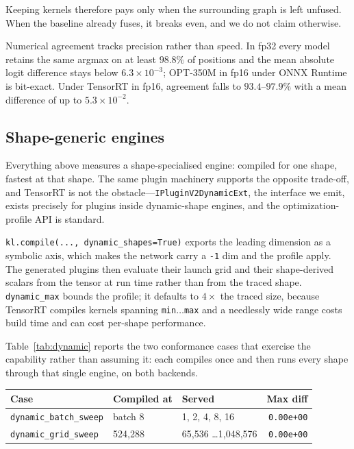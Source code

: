\documentclass[11pt,a4paper]{article}
\begin{document}
Keeping kernels therefore pays only when the surrounding graph is left unfused.
When the baseline already fuses, it breaks even, and we do not claim otherwise.

Numerical agreement tracks precision rather than speed. In fp32 every model
retains the same argmax on at least $98.8\%$ of positions and the mean absolute
logit difference stays below $6.3\times10^{-3}$; OPT-350M in fp16 under ONNX
Runtime is bit-exact. Under TensorRT in fp16, agreement falls to
$93.4$--$97.9\%$ with a mean difference of up to $5.3\times10^{-2}$.

\subsection{Shape-generic engines}
\label{sec:dynamic}

Everything above measures a shape-specialised engine: compiled for one shape,
fastest at that shape. The same plugin machinery supports the opposite
trade-off, and TensorRT is not the obstacle---\texttt{IPluginV2DynamicExt}, the
interface we emit, exists precisely for plugins inside dynamic-shape engines, and
the optimization-profile API is standard.

\texttt{kl.compile(..., dynamic\_shapes=True)} exports the leading dimension as a
symbolic axis, which makes the network carry a \texttt{-1} dim and the profile
apply. The generated plugins then evaluate their launch grid and their
shape-derived scalars from the tensor at run time rather than from the traced
shape. \texttt{dynamic\_max} bounds the profile; it defaults to $4\times$ the
traced size, because TensorRT compiles kernels spanning \texttt{min}$\ldots$\texttt{max}
and a needlessly wide range costs build time and can cost per-shape performance.

Table~\ref{tab:dynamic} reports the two conformance cases that exercise the
capability rather than assuming it: each compiles once and then runs every shape
through that single engine, on both backends.

\begin{center}
\small
\begin{tabular}{l l l r}
\toprule
\textbf{Case} & \textbf{Compiled at} & \textbf{Served} & \textbf{Max diff} \\ \midrule
\texttt{dynamic\_batch\_sweep} & batch 8 & 1, 2, 4, 8, 16 & \texttt{0.00e+00} \\
\texttt{dynamic\_grid\_sweep} & 524{,}288 & 65{,}536 \ldots 1{,}048{,}576 & \texttt{0.00e+00} \\
\bottomrule
\end{tabular}
\label{tab:dynamic}
\end{center}
\end{document}
